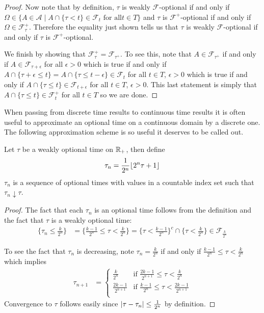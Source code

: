 \begin{proof}
Now note that by definition, $\tau$ is weakly $\mathcal{F}$-optional if and only if
$\Omega \in \lbrace A \in \mathcal{A}
\mid A \cap \lbrace \tau < t \rbrace \in \mathcal{F}_t \text { for all
} t \in T \rbrace$ and $\tau$ is $\mathcal{F}^+$-optional
if and only if $\Omega \in \mathcal{F}^+_\tau$.  Therefore the equality just shown tells us that
$\tau$ is weakly $\mathcal{F}$-optional if and only if $\tau$ is 
$\mathcal{F}^+$-optional.

We finish by showing that $\mathcal{F}^+_\tau =
\mathcal{F}_{\tau^+}$.  To see this, note that $A \in
\mathcal{F}_{\tau^+}$ if and only if $A \in
\mathcal{F}_{\tau + \epsilon}$ for all $\epsilon > 0$ which is true if and only
if $A \cap \lbrace \tau + \epsilon \leq t 
\rbrace =  A \cap \lbrace \tau \leq t - \epsilon
\rbrace\in \mathcal{F}_{t}$ for all $t \in T$, $\epsilon > 0$ which is
true if and only if $A \cap \lbrace \tau \leq t 
\rbrace\in \mathcal{F}_{t+\epsilon}$ for all $t \in T$, $\epsilon >
0$.  This last statement is simply that $A \cap \lbrace \tau \leq t 
\rbrace\in \mathcal{F}^+_t$ for all $t \in T$ so we are done.
\end{proof}

When passing from discrete time results to continuous time results it
is often useful to approximate an optional time on a continuous domain
by a discrete one.  The following approximation scheme is so useful it
deserves to be called out.

\begin{lem}\label{DiscreteApproximationOptionalTimes}Let $\tau$ be a weakly optional time on $\mathbb{R}_+$, then define
\begin{align*}
\tau_n = \frac{1}{2^n} \lfloor 2^n \tau + 1 \rfloor
\end{align*}
$\tau_n$ is a sequence of optional times with values in a
countable index set such that $\tau_n\downarrow \tau$.
\end{lem}
\begin{proof}
The fact that each $\tau_n$ is an optional time follows from the
definition and the fact that $\tau$ is a weakly optional time:
\begin{align*}
\lbrace \tau_n \leq \frac{k}{2^n} \rbrace &= \lbrace \frac{k-1}{2^n}
\leq \tau < \frac{k}{2^n} \rbrace = \lbrace \tau < \frac{k-1}{2^n}
\rbrace^c \cap \lbrace
\tau < \frac{k}{2^n} \rbrace \in \mathcal{F}_{\frac{k}{2^n}}
\end{align*}

To see the fact that $\tau_n$ is decreasing, note $\tau_n =
\frac{k}{2^n}$ if and only if $\frac{k-1}{2^n} \leq \tau <
\frac{k}{2^n}$  
which implies 
\begin{align*}
\tau_{n+1} &= \begin{cases}
\frac{k}{2^n} & \text{if $\frac{2k-1}{2^{n+1}} \leq \tau < \frac{k}{2^n}$} \\
\frac{2k-1}{2^{n+1}} & \text{if $\frac{k-1}{2^{n}} \leq \tau < \frac{2k-1}{2^{n+1}}$} \\
\end{cases}
\end{align*}
Convergence to $\tau$ follows easily since $\left \vert \tau - \tau_n \right \vert \leq \frac{1}{2^n}$ by definition.
\end{proof}

